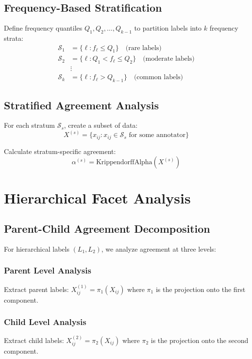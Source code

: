 \documentclass[11pt]{article}
\begin{document}
\subsection{Frequency-Based Stratification}

Define frequency quantiles $Q_1, Q_2, \ldots, Q_{k-1}$ to partition labels into $k$ frequency strata:
\begin{align}
\mathcal{S}_1 &= \{\ell : f_\ell \leq Q_1\} \quad \text{(rare labels)} \\
\mathcal{S}_2 &= \{\ell : Q_1 < f_\ell \leq Q_2\} \quad \text{(moderate labels)} \\
&\vdots \\
\mathcal{S}_k &= \{\ell : f_\ell > Q_{k-1}\} \quad \text{(common labels)}
\end{align}

\subsection{Stratified Agreement Analysis}

For each stratum $\mathcal{S}_s$, create a subset of data:
\begin{equation}
X^{(s)} = \{x_{ij} : x_{ij} \in \mathcal{S}_s \text{ for some annotator}\}
\end{equation}

Calculate stratum-specific agreement:
\begin{equation}
\alpha^{(s)} = \text{KrippendorffAlpha}(X^{(s)})
\end{equation}

\section{Hierarchical Facet Analysis}

\subsection{Parent-Child Agreement Decomposition}

For hierarchical labels $(L_1, L_2)$, we analyze agreement at three levels:

\subsubsection{Parent Level Analysis}
Extract parent labels: $X^{(1)}_{ij} = \pi_1(X_{ij})$ where $\pi_1$ is the projection onto the first component.

\subsubsection{Child Level Analysis}
Extract child labels: $X^{(2)}_{ij} = \pi_2(X_{ij})$ where $\pi_2$ is the projection onto the second component.
\end{document}
